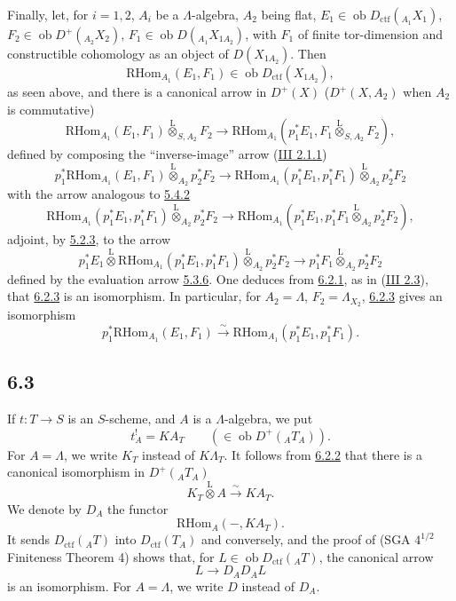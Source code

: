 \documentclass[11pt]{article}
\providecommand{\RHom}{\mathrm{RHom}}
\providecommand{\lten}{\overset{\mathrm L}{\otimes}}
\providecommand{\Ob}{\operatorname{ob}}
\providecommand{\RHom}{\mathrm{RHom}}
\providecommand{\lten}{\overset{\mathrm L}{\otimes}}
\providecommand{\RHom}{\mathrm R\mathcal{H}om}
\providecommand{\lten}{\overset{\mathrm L}{\otimes}}
\providecommand{\Ob}{\operatorname{ob}}
\providecommand{\lten}{\overset{\mathrm L}{\otimes}}
\providecommand{\lten}{\overset{\mathrm L}{\otimes}}
\providecommand{\Ob}{\operatorname{Ob}}
\providecommand{\lten}{\overset{\mathrm L}{\otimes}}
\providecommand{\RHom}{\mathrm{RHom}}
\providecommand{\Ob}{\operatorname{ob}}
\providecommand{\Ob}{\operatorname{Ob}}
\providecommand{\lten}{\overset{\mathrm L}{\otimes}}
\begin{document}
Finally, let, for $i=1,2$, $A_i$ be a $\Lambda$-algebra, $A_2$ being flat, $E_1\in\Ob D_{\mathrm{ctf}}({}_{A_1}X_1)$, $F_2\in\Ob D^+({}_{A_2}X_2)$, $F_1\in\Ob D({}_{A_1}X_{1A_2})$, with $F_1$ of finite tor-dimension and constructible cohomology as an object of $D(X_{1A_2})$. Then
\[
\RHom_{A_1}(E_1,F_1)\in\Ob D_{\mathrm{ctf}}(X_{1A_2}),
\]
as seen above, and there is a canonical arrow in $D^+(X)$ ($D^+(X,A_2)$ when $A_2$ is commutative)
\begin{equation}
\RHom_{A_1}(E_1,F_1)\lten_{S,A_2}F_2
\longrightarrow
\RHom_{A_1}(p_1^*E_1,F_1\lten_{S,A_2}F_2),
\tag{6.2.3}\label{sga5:IIIB:equation:6.2.3}
\end{equation}
defined by composing the “inverse-image” arrow (\hyperref[sga5:III:equation:2.1.1]{III 2.1.1})
\[
p_1^*\RHom_{A_1}(E_1,F_1)\lten_{A_2}p_2^*F_2
\longrightarrow
\RHom_{A_1}(p_1^*E_1,p_1^*F_1)\lten_{A_2}p_2^*F_2
\]
with the arrow analogous to \hyperref[sga5:IIIB:equation:5.4.2]{5.4.2}
\[
\RHom_{A_1}(p_1^*E_1,p_1^*F_1)\lten_{A_2}p_2^*F_2
\longrightarrow
\RHom_{A_1}(p_1^*E_1,p_1^*F_1\lten_{A_2}p_2^*F_2),
\]
adjoint, by \hyperref[sga5:IIIB:equation:5.2.3]{5.2.3}, to the arrow
\[
p_1^*E_1\lten\RHom_{A_1}(p_1^*E_1,p_1^*F_1)\lten_{A_2}p_2^*F_2
\longrightarrow
p_1^*F_1\lten_{A_2}p_2^*F_2
\]
defined by the evaluation arrow \hyperref[sga5:IIIB:equation:5.3.6]{5.3.6}. One deduces from \hyperref[sga5:IIIB:equation:6.2.1]{6.2.1}, as in (\hyperref[sga5:III:proposition:2.3]{III 2.3}), that \hyperref[sga5:IIIB:equation:6.2.3]{6.2.3} is an isomorphism. In particular, for $A_2=\Lambda$, $F_2=\Lambda_{X_2}$, \hyperref[sga5:IIIB:equation:6.2.3]{6.2.3} gives an isomorphism
\begin{equation}
p_1^*\RHom_{A_1}(E_1,F_1)
\xrightarrow{\sim}
\RHom_{A_1}(p_1^*E_1,p_1^*F_1).
\tag{6.2.4}\label{sga5:IIIB:equation:6.2.4}
\end{equation}

\subsection*{6.3}\label{sga5:IIIB:subsection:6.3}
If $t:T\to S$ is an $S$-scheme, and $A$ is a $\Lambda$-algebra, we put
\begin{equation}
t_A^! = KA_T \qquad(\in\Ob D^+({}_AT_A)).
\tag{6.3.1}\label{sga5:IIIB:equation:6.3.1}
\end{equation}
For $A=\Lambda$, we write $K_T$ instead of $K\Lambda_T$. It follows from \hyperref[sga5:IIIB:equation:6.2.2]{6.2.2} that there is a canonical isomorphism in $D^+({}_AT_A)$
\begin{equation}
K_T\lten A\xrightarrow{\sim}KA_T.
\tag{6.3.2}\label{sga5:IIIB:equation:6.3.2}
\end{equation}
We denote by $D_A$ the functor
\[
\RHom_A(-,KA_T).
\]
It sends $D_{\mathrm{ctf}}({}_AT)$ into $D_{\mathrm{ctf}}(T_A)$ and conversely, and the proof of (SGA $4^{1/2}$ Finiteness Theorem 4) shows that, for $L\in\Ob D_{\mathrm{ctf}}({}_AT)$, the canonical arrow
\[
L\longrightarrow D_AD_AL
\]
is an isomorphism. For $A=\Lambda$, we write $D$ instead of $D_A$.
\end{document}

